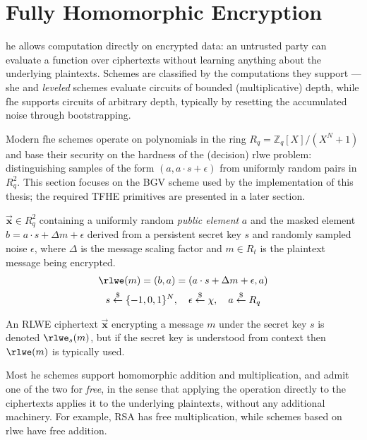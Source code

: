 \renewcommand{\vec}[1]{\overrightarrow{\mathbf{#1}}}

\section{Fully Homomorphic Encryption}
\gls{he} allows computation directly on encrypted data: an untrusted party can evaluate a function over ciphertexts without learning anything about the underlying plaintexts. Schemes are classified by the computations they support --- \gls{she} and \textit{leveled} schemes evaluate circuits of bounded (multiplicative) depth, while \gls{fhe} supports circuits of arbitrary depth, typically by resetting the accumulated noise through bootstrapping.

Modern \gls{fhe} schemes operate on polynomials in the ring $R_q = \mathbb{Z}_q[X]/(X^N+1)$ and base their security on the hardness of the (decision) \gls{rlwe} problem: distinguishing samples of the form $(a, a\cdot s + \epsilon)$ from uniformly random pairs in $R_q^2$. This section focuses on the BGV scheme \cite{cryptoeprint:2011/277} used by the implementation of this thesis; the required TFHE primitives are presented in a later section.

\begin{definition} $\vec{x} \in R_q^2$ containing a uniformly random \textit{public element} $a$ and the masked element $b = a\cdot s + \Delta m + \epsilon$ derived from a persistent secret key $s$ and randomly sampled noise $\epsilon$, where $\Delta$ is the message scaling factor and $m\in R_t$ is the plaintext message being encrypted.
    \begin{gather} %
        \rlwe(m) = (b, a) = (a\cdot s + \Delta m + \epsilon, a) \\
        s \overset{\$}{\leftarrow} \{-1,0,1\}^N,\quad \epsilon \overset{\$}{\leftarrow} \chi, \quad a \overset{\$}{\leftarrow} R_q
    \end{gather}

    An RLWE ciphertext $\vec{x}$ encrypting a message $m$ under the secret key $s$ is denoted $\rlwe_s(m)$, but if the secret key is understood from context then $\rlwe(m)$ is typically used.
\end{definition}

Most \gls{he} schemes support homomorphic addition and multiplication, and admit one of the two for \textit{free}, in the sense that applying the operation directly to the ciphertexts applies it to the underlying plaintexts, without any additional machinery. For example, RSA has free multiplication, while schemes based on \gls{rlwe} have free addition.

